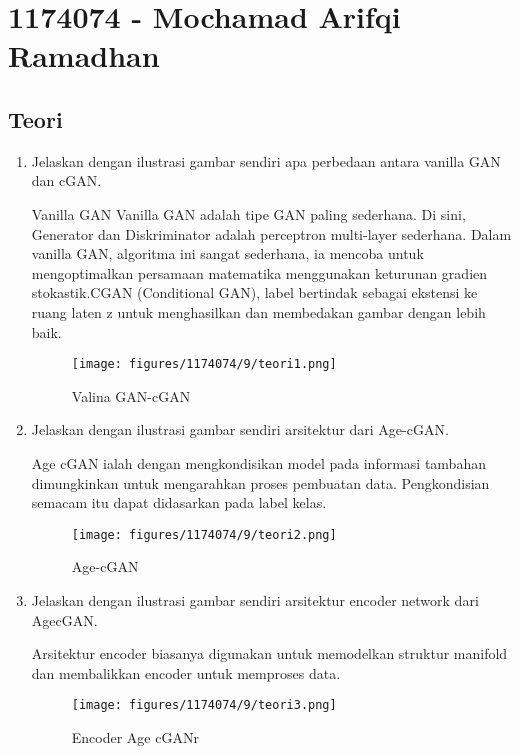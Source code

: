 \section{1174074 - Mochamad Arifqi Ramadhan}

\subsection{Teori}
\begin{enumerate}

        \item Jelaskan dengan ilustrasi gambar sendiri apa perbedaan antara vanilla GAN dan cGAN.

Vanilla GAN Vanilla GAN adalah tipe GAN paling sederhana. Di sini, Generator dan Diskriminator adalah perceptron multi-layer sederhana. Dalam vanilla GAN, algoritma ini sangat sederhana, ia mencoba untuk mengoptimalkan persamaan matematika menggunakan keturunan gradien stokastik.CGAN (Conditional GAN), label bertindak sebagai ekstensi ke ruang laten z untuk menghasilkan dan membedakan gambar dengan lebih baik. 

	\begin{figure}[H]
     	\texttt{[image: figures/1174074/9/teori1.png]}
         	\centering
           	\caption{Valina GAN-cGAN}
        	\end{figure}

        \item Jelaskan dengan ilustrasi gambar sendiri arsitektur dari Age-cGAN.

Age cGAN ialah dengan mengkondisikan model pada informasi tambahan dimungkinkan untuk mengarahkan proses pembuatan data. Pengkondisian semacam itu dapat didasarkan pada label kelas.

	\begin{figure}[H]
		\texttt{[image: figures/1174074/9/teori2.png]}
            	\centering
           	\caption{Age-cGAN}
       	 \end{figure}

        \item Jelaskan dengan ilustrasi gambar sendiri arsitektur encoder network dari AgecGAN.

Arsitektur encoder biasanya digunakan untuk memodelkan struktur manifold dan membalikkan encoder untuk memproses data.

	\begin{figure}[H]
		\texttt{[image: figures/1174074/9/teori3.png]}
            	\centering
           	\caption{Encoder Age cGANr}
       	 \end{figure}


\end{enumerate}
